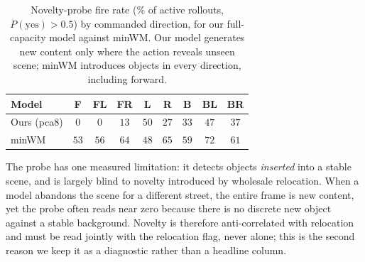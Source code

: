 \begin{table}[t]
\centering
\small
\caption{
    Novelty-probe fire rate (\% of active rollouts, $P(\text{yes})>0.5$) by
    commanded direction, for our full-capacity model against minWM. Our model
    generates new content only where the action reveals unseen scene; minWM
    introduces objects in every direction, including forward.
}
\label{tab:novelty_direction}
\begin{tabular}{lcccccccc}
\toprule
Model & F & FL & FR & L & R & B & BL & BR \\
\midrule
Ours (pca8) & $0$  & $0$  & $13$ & $50$ & $27$ & $33$ & $47$ & $37$ \\
minWM       & $53$ & $56$ & $64$ & $48$ & $65$ & $59$ & $72$ & $61$ \\
\bottomrule
\end{tabular}
\end{table}

The probe has one measured limitation: it detects objects \emph{inserted} into a
stable scene, and is largely blind to novelty introduced by wholesale
relocation. When a model abandons the scene for a different street, the entire
frame is new content, yet the probe often reads near zero because there is no
discrete new object against a stable background. Novelty is therefore
anti-correlated with relocation and must be read jointly with the relocation
flag, never alone; this is the second reason we keep it as a diagnostic rather
than a headline column.
